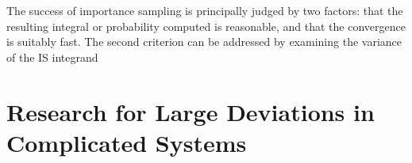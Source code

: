 \documentclass[12pt]{scrartcl}
\begin{document}
The success of importance sampling is principally judged by two factors: that the resulting integral or probability computed is reasonable, and that the convergence is suitably fast. The second criterion can be addressed by examining the variance of the IS integrand
%



\section{Research for Large Deviations in Complicated Systems}
\end{document}
